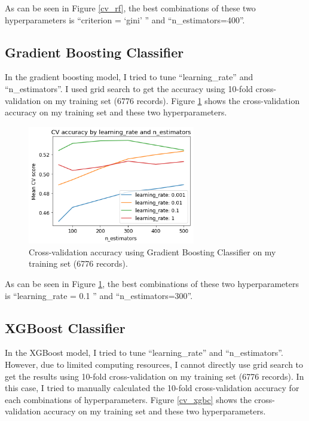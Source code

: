 \documentclass[11pt]{article}
\begin{document}
As can be seen in Figure \ref{cv_rf}, the best combinations of these two hyperparameters is ``criterion = `gini' '' and ``n\_estimators=400''.

\subsection{ Gradient Boosting Classifier }
In the gradient boosting model, I tried to tune ``learning\_rate'' and ``n\_estimators''. I used grid search to get the accuracy using 10-fold cross-validation on my training set (6776 records). Figure \ref{cv_gbc} shows the cross-validation accuracy on my training set and these two hyperparameters. 

\begin{figure}[H]
  \caption{Cross-validation accuracy using Gradient Boosting Classifier on my training set (6776 records).}
  \label{cv_gbc}
  \centering
  \includegraphics[width=0.65\textwidth]{../img/cv_gbc.png}
\end{figure}

As can be seen in Figure \ref{cv_gbc}, the best combinations of these two hyperparameters is ``learning\_rate = 0.1 '' and ``n\_estimators=300''.

\subsection{ XGBoost Classifier}
In the XGBoost model, I tried to tune ``learning\_rate'' and ``n\_estimators''. However, due to limited computing resources, I cannot directly use grid search to get the results using 10-fold cross-validation on my training set (6776 records). In this case, I tried to manually calculated the 10-fold cross-validation accuracy for each combinations of hyperparameters. Figure \ref{cv_xgbc} shows the cross-validation accuracy on my training set and these two hyperparameters. 
\end{document}
